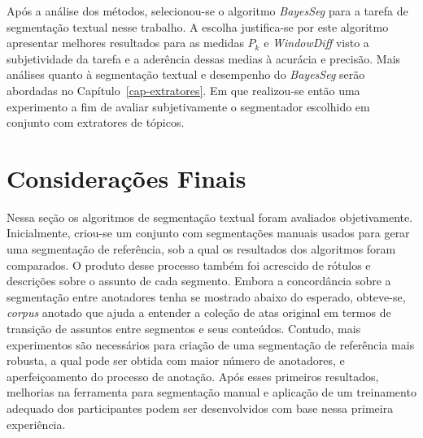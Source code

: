 


Após a análise dos métodos, selecionou-se o algoritmo \textit{BayesSeg} para a tarefa de segmentação textual nesse trabalho. 
A escolha justifica-se por este algoritmo apresentar melhores resultados para as medidas $P_k$ e \textit{WindowDiff} visto a subjetividade da tarefa e a aderência dessas medias à acurácia e precisão. Mais análises quanto à segmentação textual e desempenho do \textit{BayesSeg} serão abordadas no Capítulo~\ref{cap-extratores}. Em que realizou-se então uma experimento a fim de avaliar subjetivamente o segmentador escolhido em conjunto com extratores de tópicos.







\section{Considerações Finais}



Nessa seção os algoritmos de segmentação textual foram avaliados objetivamente. 
Inicialmente, criou-se um conjunto com segmentações manuais usados para gerar uma segmentação de referência, sob a qual os resultados dos algoritmos foram comparados. O produto  desse processo também foi acrescido de rótulos e descrições sobre o assunto de cada segmento.
Embora a concordância sobre a segmentação entre anotadores tenha se mostrado abaixo do esperado, obteve-se, \textit{corpus} anotado que ajuda a entender a coleção de atas original em termos de transição de assuntos entre segmentos e seus conteúdos.
Contudo, mais experimentos são necessários para criação de uma segmentação de referência mais robusta, a qual pode ser obtida com maior número de anotadores, e aperfeiçoamento do processo de anotação. Após esses primeiros resultados, melhorias na ferramenta para segmentação manual e aplicação de um treinamento adequado dos participantes podem ser desenvolvidos com base nessa primeira experiência.

